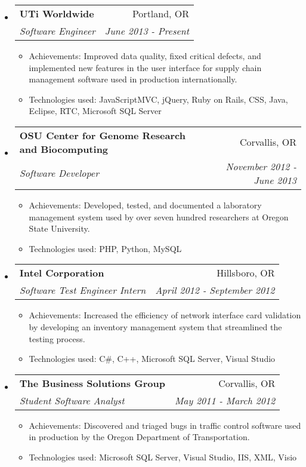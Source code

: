 \documentclass[letterpaper,11pt]{article}
\makeatletter
\newcommand{\resitem}[1]{\item #1 \vspace{-2pt}}
\newcommand{\ressubheading}[4]{

\begin{tabular*}{6.5in}{l@{\cftdotfill{\cftsecdotsep}\extracolsep{\fill}}r}

\textbf{#1} & #2 \\

\textit{#3} & \textit{#4} \\

\end{tabular*}\vspace{-6pt}}
\makeatother
\begin{document}
\begin{itemize}

	\item

		\ressubheading{UTi Worldwide}{Portland, OR}{Software Engineer}{June 2013 - Present}

		\begin{itemize}

		\resitem{Achievements: Improved data quality, fixed critical defects, and implemented new features in the user interface for supply chain management software used in production internationally.}
		\resitem{Technologies used: JavaScriptMVC, jQuery, Ruby on Rails, CSS, Java, Eclipse, RTC, Microsoft SQL Server}

		\end{itemize}

	\item
        
	\ressubheading{OSU Center for Genome Research and Biocomputing}{Corvallis, OR}{Software Developer}{November 2012 - June 2013}

        \begin{itemize}

    	\resitem{Achievements: Developed, tested, and documented a laboratory management system used by over seven hundred researchers at Oregon State University.}
		\resitem{Technologies used: PHP, Python, MySQL}

		\end{itemize}

	\item
        
	\ressubheading{Intel Corporation}{Hillsboro, OR}{Software Test Engineer Intern}{April 2012 - September 2012}

        \begin{itemize}

    	\resitem{Achievements: Increased the efficiency of network interface card validation by developing an inventory management system that streamlined the testing process.}
		\resitem{Technologies used: C\#, C++, Microsoft SQL Server, Visual Studio}

		\end{itemize}

	\item
	
	\ressubheading{The Business Solutions Group}{Corvallis, OR}{Student Software Analyst}{May 2011 -  March 2012}

       	\begin{itemize}

		\resitem{Achievements: Discovered and triaged bugs in traffic control software used in production by the Oregon Department of Transportation.}
		\resitem{Technologies used: Microsoft SQL Server, Visual Studio, IIS, XML, Visio }

		\end{itemize}
	
\end{itemize}
\end{document}
